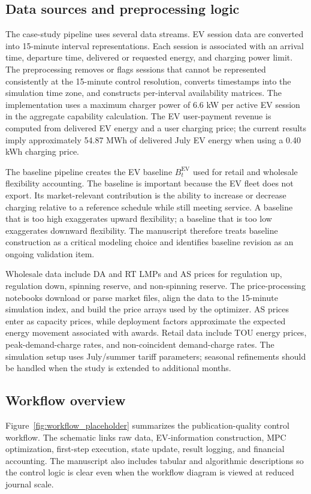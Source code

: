 \documentclass[final,5p,times]{elsarticle}
\newcommand{\EV}{\mathrm{EV}}
\begin{document}
\subsection{Data sources and preprocessing logic}
The case-study pipeline uses several data streams. EV session data are converted into 15-minute interval representations. Each session is associated with an arrival time, departure time, delivered or requested energy, and charging power limit. The preprocessing removes or flags sessions that cannot be represented consistently at the 15-minute control resolution, converts timestamps into the simulation time zone, and constructs per-interval availability matrices. The implementation uses a maximum charger power of 6.6 kW per active EV session in the aggregate capability calculation. The EV user-payment revenue is computed from delivered EV energy and a user charging price; the current results imply approximately 54.87 MWh of delivered July EV energy when using a 0.40 \/kWh charging price.

The baseline pipeline creates the EV baseline $B_t^{\EV}$ used for retail and wholesale flexibility accounting. The baseline is important because the EV fleet does not export. Its market-relevant contribution is the ability to increase or decrease charging relative to a reference schedule while still meeting service. A baseline that is too high exaggerates upward flexibility; a baseline that is too low exaggerates downward flexibility. The manuscript therefore treats baseline construction as a critical modeling choice and identifies baseline revision as an ongoing validation item.

Wholesale data include DA and RT LMPs and AS prices for regulation up, regulation down, spinning reserve, and non-spinning reserve. The price-processing notebooks download or parse market files, align the data to the 15-minute simulation index, and build the price arrays used by the optimizer. AS prices enter as capacity prices, while deployment factors approximate the expected energy movement associated with awards. Retail data include TOU energy prices, peak-demand-charge rates, and non-coincident demand-charge rates. The simulation setup uses July/summer tariff parameters; seasonal refinements should be handled when the study is extended to additional months.

\subsection{Workflow overview}
Figure~\ref{fig:workflow_placeholder} summarizes the publication-quality control workflow. The schematic links raw data, EV-information construction, MPC optimization, first-step execution, state update, result logging, and financial accounting. The manuscript also includes tabular and algorithmic descriptions so the control logic is clear even when the workflow diagram is viewed at reduced journal scale.
\end{document}
